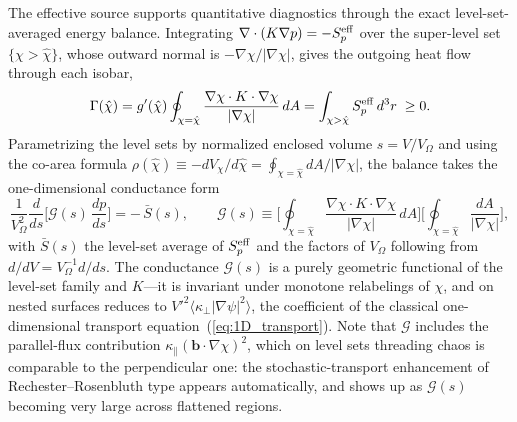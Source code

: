 \documentclass[english]{article}
\newcommand{\bb}{\mathbf{b}}
\begin{document}
The effective source supports quantitative diagnostics through the exact level-set-averaged energy
balance. Integrating $\nabla\cdot(K\nabla p)=-S_p^{\rm eff}$ over the super-level set
$\{\chi>\hat\chi\}$, whose outward normal is $-\nabla\chi/|\nabla\chi|$, gives the outgoing heat
flow through each isobar,
\begin{equation}
\Gamma(\hat\chi)=g'(\hat\chi)\oint_{\chi=\hat\chi}
\frac{\nabla\chi\cdot K\cdot\nabla\chi}{|\nabla\chi|}\,dA
=\int_{\chi>\hat\chi}S_p^{\rm eff}\,d^3r\;\ge0 .
\label{eq:levelset_balance}
\end{equation}
Parametrizing the level sets by normalized enclosed volume $s=V/V_\Omega$ and using the co-area formula
$\rho(\hat\chi)\equiv-dV_\chi/d\hat\chi=\oint_{\chi=\hat\chi}dA/|\nabla\chi|$, the balance takes
the one-dimensional conductance form
\begin{equation}
\frac{1}{V_\Omega^2}\frac{d}{ds}\Big[\mathcal G(s)\,\frac{dp}{ds}\Big]=-\,\bar S(s),
\qquad
\mathcal G(s)\equiv\bigg[\oint_{\chi=\hat\chi}\frac{\nabla\chi\cdot K\cdot\nabla\chi}{|\nabla\chi|}\,dA\bigg]
\bigg[\oint_{\chi=\hat\chi}\frac{dA}{|\nabla\chi|}\bigg] ,
\label{eq:conductance}
\end{equation}
with $\bar S(s)$ the level-set average of $S_p^{\rm eff}$ and the factors of $V_\Omega$ following
from $d/dV=V_\Omega^{-1}d/ds$. The conductance $\mathcal G(s)$ is a purely
geometric functional of the level-set family and $K$---it is invariant under monotone relabelings
of $\chi$, and on nested surfaces reduces to $V'^2\langle\kappa_\perp|\nabla\psi|^{2}\rangle$, the
coefficient of the classical one-dimensional transport equation~(\ref{eq:1D_transport}). Note that
$\mathcal G$ includes the parallel-flux contribution $\kappa_\parallel(\bb\cdot\nabla\chi)^{2}$, which on
level sets threading chaos is comparable to the perpendicular one: the stochastic-transport
enhancement of Rechester--Rosenbluth type \cite{rechester1978} appears automatically, and shows up
as $\mathcal G(s)$ becoming very large across flattened regions.
\end{document}
